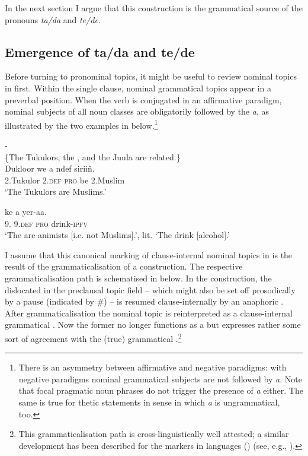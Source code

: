 \documentclass[output=paper
,newtxmath
,modfonts
,nonflat]{langsci/langscibook}
\begin{document}
In the next section I argue that this construction is the grammatical source of the pronouns \textit{ta/da} and \textit{te/de}.

\subsection{Emergence of ta/da and te/de}\label{sec:apel:2.2}

Before turning to pronominal  topics, it might be useful to review nominal  topics in  first. Within the single clause, nominal grammatical  topics appear in a preverbal position. When the verb is conjugated in an affirmative paradigm, nominal subjects of all noun classes are obligatorily followed by the  \textit{a}, as illustrated by the two examples in  below.\footnote{There is an asymmetry between affirmative and negative paradigms: with negative paradigms nominal grammatical subjects are not followed by \textit{a}. Note that focal pragmatic  noun phrases do not trigger the presence of \textit{a} either. The same is true for thetic statements in  sense in which \textit{a} is ungrammatical, too.}

\ea\label{ex:apel:12}{- \citep[289]{Faye1979}}\\
\{The Tukulors, the , and the Juula are related.\}\\
\ea\label{ex:apel:12a}
\gll Dukloor we a ndef siriiñ.\\
     \textsc{2.}Tukulor \textsc{2.def} \textsc{pro} be \textsc{2.}Muslim\\
\glt ‘The Tukulors are Muslims.’

\ex\label{ex:apel:12b}
\gll {} ke a yer-aa.\\
     \textsc{9.} \textsc{9.def} \textsc{pro} drink\textsc{-ipfv}\\
\glt ‘The  are animists [i.e. not Muslims].’, lit. ‘The  drink [alcohol].’
\z
\z

I assume that this canonical marking of clause-internal nominal  topics in  is the result of the grammaticalisation of a  construction. The respective grammaticalisation path is schematised in  below. In the  construction, the dislocated  in the preclausal topic field -- which might also be set off prosodically by a pause (indicated by \#) -- is resumed clause-internally by an anaphoric . After grammaticalisation the nominal topic is reinterpreted as a clause-internal grammatical . Now the former  no longer functions as a  but expresses rather some sort of agreement with the (true) grammatical .\footnote{This grammaticalisation path is cross-linguistically well attested; a similar development has been described for the  markers in  languages () (see, e.g., \citealt{Morimoto2008}).}
\end{document}
